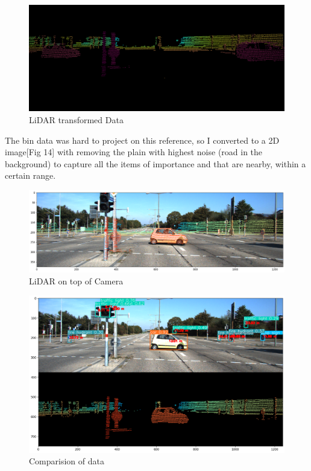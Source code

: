 \documentclass[letterpaper, 10 pt, conference]{ieeeconf}  %
\begin{document}
\begin{figure}[htbp]
  \centering
  \includegraphics[width=\linewidth]{LidarImageTransformed.png}
  \caption{LiDAR transformed Data}
  \label{LiDAR transformed Data}
\end{figure}

The bin data was hard to project on this reference, so I converted to a 2D image[Fig 14] with removing the plain with highest noise (road in the background) to capture all the items of importance and that are nearby, within a certain range.

\begin{figure}[htbp]
  \centering
  \includegraphics[width=\linewidth]{LidarOnTop.png}
  \caption{LiDAR on top of Camera}
  \label{LiDAR on top of Camera}
\end{figure}

\begin{figure}[htbp]
  \centering
  \includegraphics[width=\linewidth]{stacked.png}
  \caption{Comparision of data}
  \label{Comparision of data}
\end{figure}
\end{document}
